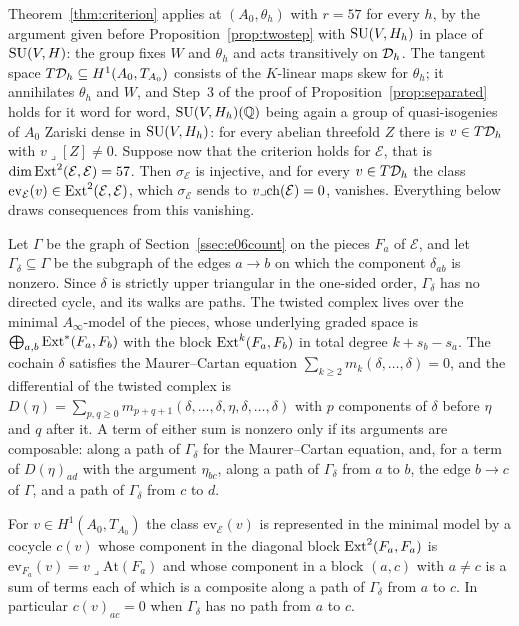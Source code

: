 Theorem~\ref{thm:criterion} applies at $(A_{0},\theta_{h})$ with $r=57$ for every $h$, by the argument given before Proposition~\ref{prop:twostep} with $\mathrm{SU}(V,H_{h})$ in place of $\mathrm{SU}(V,H)$: the group fixes $W$ and $\theta_{h}$ and acts transitively on $\mathcal{D}_{h}$. The tangent space $T\mathcal{D}_{h}\subseteq H^{1}(A_{0},T_{A_{0}})$ consists of the $K$-linear maps skew for $\theta_{h}$; it annihilates $\theta_{h}$ and $W$, and Step~3 of the proof of Proposition~\ref{prop:separated} holds for it word for word, $\mathrm{SU}(V,H_{h})(\mathbb{Q})$ being again a group of quasi-isogenies of $A_{0}$ Zariski dense in $\mathrm{SU}(V,H_{h})$: for every abelian threefold $Z$ there is $v\in T\mathcal{D}_{h}$ with $v\lrcorner[Z]\ne0$. Suppose now that the criterion holds for $\mathcal{E}$, that is $\dim\mathrm{Ext}^{2}(\mathcal{E},\mathcal{E})=57$. Then $\sigma_{\mathcal{E}}$ is injective, and for every $v\in T\mathcal{D}_{h}$ the class $\mathrm{ev}_{\mathcal{E}}(v)\in\mathrm{Ext}^{2}(\mathcal{E},\mathcal{E})$, which $\sigma_{\mathcal{E}}$ sends to $v\lrcorner\mathrm{ch}(\mathcal{E})=0$, vanishes. Everything below draws consequences from this vanishing.

Let $\Gamma$ be the graph of Section~\ref{ssec:e06count} on the pieces $F_{a}$ of $\mathcal{E}$, and let $\Gamma_{\delta}\subseteq\Gamma$ be the subgraph of the edges $a\to b$ on which the component $\delta_{ab}$ is nonzero. Since $\delta$ is strictly upper triangular in the one-sided order, $\Gamma_{\delta}$ has no directed cycle, and its walks are paths. The twisted complex lives over the minimal $A_{\infty}$-model of the pieces, whose underlying graded space is $\bigoplus_{a,b}\mathrm{Ext}^{*}(F_{a},F_{b})$ with the block $\mathrm{Ext}^{k}(F_{a},F_{b})$ in total degree $k+s_{b}-s_{a}$. The cochain $\delta$ satisfies the Maurer--Cartan equation $\sum_{k\ge2}m_{k}(\delta,\dots,\delta)=0$, and the differential of the twisted complex is $D(\eta)=\sum_{p,q\ge0}m_{p+q+1}(\delta,\dots,\delta,\eta,\delta,\dots,\delta)$ with $p$ components of $\delta$ before $\eta$ and $q$ after it. A term of either sum is nonzero only if its arguments are composable: along a path of $\Gamma_{\delta}$ for the Maurer--Cartan equation, and, for a term of $D(\eta)_{ad}$ with the argument $\eta_{bc}$, along a path of $\Gamma_{\delta}$ from $a$ to $b$, the edge $b\to c$ of $\Gamma$, and a path of $\Gamma_{\delta}$ from $c$ to $d$.

\begin{lemma}\label{lem:cocycle}
For $v\in H^{1}(A_{0},T_{A_{0}})$ the class $\mathrm{ev}_{\mathcal{E}}(v)$ is represented in the minimal model by a cocycle $c(v)$ whose component in the diagonal block $\mathrm{Ext}^{2}(F_{a},F_{a})$ is $\mathrm{ev}_{F_{a}}(v)=v\lrcorner\mathrm{At}(F_{a})$ and whose component in a block $(a,c)$ with $a\ne c$ is a sum of terms each of which is a composite along a path of $\Gamma_{\delta}$ from $a$ to $c$. In particular $c(v)_{ac}=0$ when $\Gamma_{\delta}$ has no path from $a$ to $c$.
\end{lemma}

